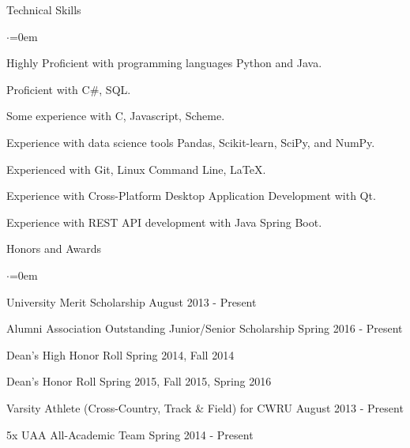 \documentclass{resume} %
\begin{document}

\begin{rSection}{Technical Skills}
\begin{list}{$\cdot$}{\leftmargin=0em}
\item Highly Proficient with programming languages Python and Java.
\vspace{-0.5em}
\item Proficient with C\#, SQL.
\vspace{-0.5em}
\item Some experience with C, Javascript, Scheme.
\vspace{-0.5em}
\item Experience with data science tools Pandas, Scikit-learn, SciPy, and NumPy.
\vspace{-0.5em}
\item Experienced with Git, Linux Command Line, LaTeX.
\vspace{-0.5em}
\item Experience with Cross-Platform Desktop Application Development with Qt.
\vspace{-0.5em}
\item Experience with REST API development with Java Spring Boot.
\vspace{-0.5em}
\end{list}
\end{rSection}


\begin{rSection}{Honors and Awards}
\begin{list}{$\cdot$}{\leftmargin=0em}
\item University Merit Scholarship \hfill August 2013 - Present
\vspace{-0.5em}
\item Alumni Association Outstanding Junior/Senior Scholarship \hfill Spring 2016 - Present
\vspace{-0.5em}
\item Dean's High Honor Roll \hfill Spring 2014, Fall 2014
\vspace{-0.5em}
\item Dean's Honor Roll \hfill Spring 2015, Fall 2015, Spring 2016
\vspace{-0.5em}
\item Varsity Athlete (Cross-Country, Track \& Field) for CWRU \hfill{August 2013 - Present}
\vspace{-0.5em}
\item 5x UAA All-Academic Team \hfill{Spring 2014 - Present}
\vspace{-0.5em}
\end{list}


\end{rSection}

\end{document}
